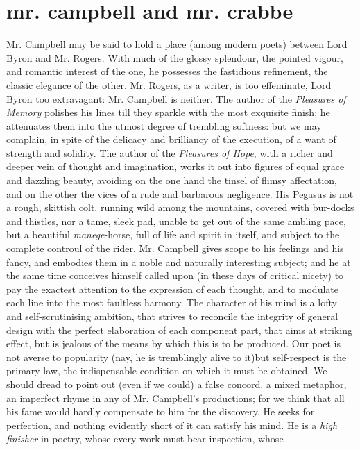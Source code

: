 \chapter[Mr. Campbell and Mr. Crabbe]
{mr. campbell {\Large and} mr. crabbe}

Mr. Campbell may be said to hold a place (among modern poets) between
Lord Byron and Mr. Rogers. With much of the glossy splendour, the
pointed vigour, and romantic interest of the one, he possesses the
fastidious refinement, the classic elegance of the other. Mr. Rogers, as
a writer, is too effeminate, Lord Byron too extravagant: Mr. Campbell is
neither. The author of the \emph{Pleasures of Memory} polishes his lines till
they sparkle with the most exquisite finish; he attenuates them into the
utmost degree of trembling softness: but we may complain, in spite of
the delicacy and brilliancy of the execution, of a want of strength
and solidity. The author of the \emph{Pleasures of Hope}, with a richer and
deeper vein of thought and imagination, works it out into figures of
equal grace and dazzling beauty, avoiding on the one hand the tinsel of
flimsy affectation, and on the other the vices of a rude and barbarous
negligence. His Pegasus is not a rough, skittish colt, running wild
among the mountains, covered with bur-docks and thistles, nor a tame,
sleek pad, unable to get out of the same ambling pace, but a beautiful
\emph{manege}-horse, full of life and spirit in itself, and subject to the
complete controul of the rider. Mr. Campbell gives scope to his feelings
and his fancy, and embodies them in a noble and naturally interesting
subject; and he at the same time conceives himself called upon (in these
days of critical nicety) to pay the exactest attention to the expression
of each thought, and to modulate each line into the most faultless
harmony. The character of his mind is a lofty and self-scrutinising
ambition, that strives to reconcile the integrity of general design with
the perfect elaboration of each component part, that aims at striking
effect, but is jealous of the means by which this is to be produced.
Our poet is not averse to popularity (nay, he is tremblingly alive to
it)\textemdash but self-respect is the primary law, the indispensable condition
on which it must be obtained. We should dread to point out (even if we
could) a false concord, a mixed metaphor, an imperfect rhyme in any of
Mr. Campbell's productions; for we think that all his fame would hardly
compensate to him for the discovery. He seeks for perfection, and
nothing evidently short of it can satisfy his mind. He is a \emph{high
finisher} in poetry, whose every work must bear inspection, whose
